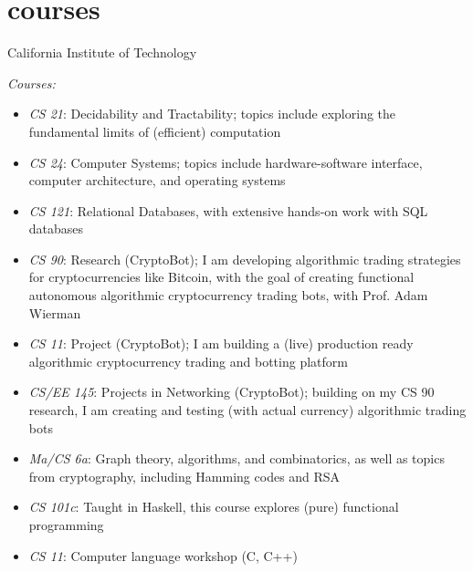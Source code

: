 \documentclass[]{mills-cv} %
\begin{document}

\section{courses}

\begin{entrylist}
\entry
{}
{California Institute of Technology}
{}
{\emph{Courses:}
\begin{itemize}
\item \emph{CS 21}: Decidability and Tractability; topics include exploring the fundamental limits of (efficient) computation
\item \emph{CS 24}: Computer Systems; topics include hardware-software interface, computer architecture, and operating systems
\item \emph{CS 121}: Relational Databases, with extensive hands-on work with SQL databases
\item \emph{CS 90}: Research (CryptoBot); I am developing algorithmic trading strategies for cryptocurrencies like Bitcoin, with the goal of creating functional autonomous algorithmic cryptocurrency trading bots, with Prof. Adam Wierman
\item \emph{CS 11}: Project (CryptoBot); I am building a (live) production ready algorithmic cryptocurrency trading and botting platform
\item \emph{CS/EE 145}: Projects in Networking (CryptoBot); building on my CS 90 research, I am creating and testing (with actual currency) algorithmic trading bots
\item \emph{Ma/CS 6a}: Graph theory, algorithms, and combinatorics, as well as topics from cryptography, including Hamming codes and RSA
\item \emph{CS 101c}: Taught in Haskell, this course explores (pure) functional programming
\item \emph{CS 11}: Computer language workshop (C, C++)

\end{itemize}}
\end{entrylist}

\end{document}
